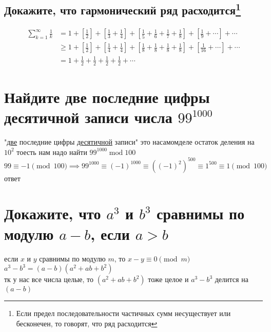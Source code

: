 \documentclass{article}
\newcommand{\Mod}[1]{\pmod{#1}}
\renewcommand{\mod}{\operatorname{mod}}
\begin{document}
  \subsection{Докажите, что гармонический ряд расходится\protect\footnote{Если предел последовательности частичных сумм несуществует или бесконечен, то говорят, что ряд расходится}}
  \begin{align*}
  \sum_{k=1}^\infty \frac{1}{k}
  & = 1 + \left[\frac{1}{2}\right] + \left[\frac{1}{3} + \frac{1}{4}\right]
  + \left[\frac{1}{5} + \frac{1}{6} + \frac{1}{7} + \frac{1}{8}\right] + \left[\frac{1}{9}+\cdots\right] +\cdots \\
  & \geq 1 + \left[\frac{1}{2}\right] + \left[\frac{1}{4} + \frac{1}{4}\right]
  + \left[\frac{1}{8} + \frac{1}{8} + \frac{1}{8} + \frac{1}{8}\right] + \left[\frac{1}{16}+\cdots\right] +\cdots \\
  & = 1 + \frac{1}{2} + \frac{1}{2} + \frac{1}{2} + \frac{1}{2} + \cdots
  \end{align*}
  \vspace{1cm} %

  \section{Найдите две последние цифры десятичной записи числа $99^{1000}$}
  "\underline{две} последние цифры \underline{десятичной} записи"{}
  это насамомделе остаток деления на $10^2$ тоесть нам надо найти $99^{1000} \mod{100}$ \\
  $99 \equiv -1 \Mod{100} \implies 99^{1000} \equiv (-1)^{1000} \equiv \left((-1)^2\right)^{500} \equiv 1^{500} \equiv 1 \Mod{100}$ \\
  ответ 

  \section{Докажите, что $a^3$ и $b^3$ сравнимы по модулю $a-b$, если $a>b$}
  если $x$ и $y$ сравнимы по модулю $m$, то $x-y \equiv 0 \Mod{m}$ \\
  $a^3 - b^3 = (a-b)(a^2+ab+b^2)$ \\
  тк у нас все числа целые, то $(a^2+ab+b^2)$ тоже целое и $a^3 - b^3$ делится на $(a-b)$
\end{document}
